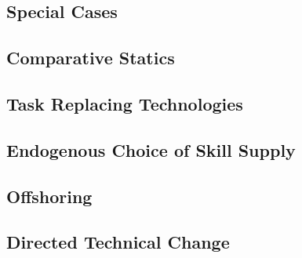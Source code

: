 \documentclass[12pt]{article}
\newcommand{\CiteReference}{../reference.bib}
\theoremstyle{definition}
\begin{document}
\subsection{Special Cases}

\subsection{Comparative Statics}

\subsection{Task Replacing Technologies}

\subsection{Endogenous Choice of Skill Supply}

\subsection{Offshoring}

\subsection{Directed Technical Change}





\end{document}
